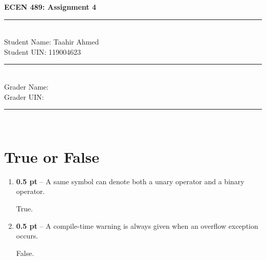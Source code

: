 \documentclass{article}
\begin{document}
\textbf{\Large ECEN 489: Assignment 4}

\noindent\rule{\textwidth}{0.4pt}\\
Student Name: Taahir Ahmed\\
Student UIN: 119004623\\
\noindent\rule{\textwidth}{0.4pt}\\
Grader Name:\\
Grader UIN:\\
\noindent\rule{\textwidth}{0.4pt}\\

\section*{True or False}
\begin{enumerate}
  \item \textbf{0.5 pt} -- A same symbol can denote both a unary operator and a
    binary operator.

    True.

  \item \textbf{0.5 pt} -- A compile-time warning is always given when an
    overflow exception occurs.

    False.
\end{enumerate}
\end{document}
